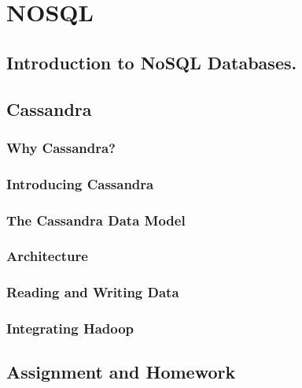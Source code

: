 \section{NOSQL}
\subsection{Introduction to NoSQL Databases.}
\subsection{Cassandra}
\subsubsection{Why Cassandra?}
\subsubsection{Introducing Cassandra}
\subsubsection{The Cassandra Data Model}
\subsubsection{Architecture}
\subsubsection{Reading and Writing Data}
\subsubsection{Integrating Hadoop}
\subsection{Assignment and Homework}